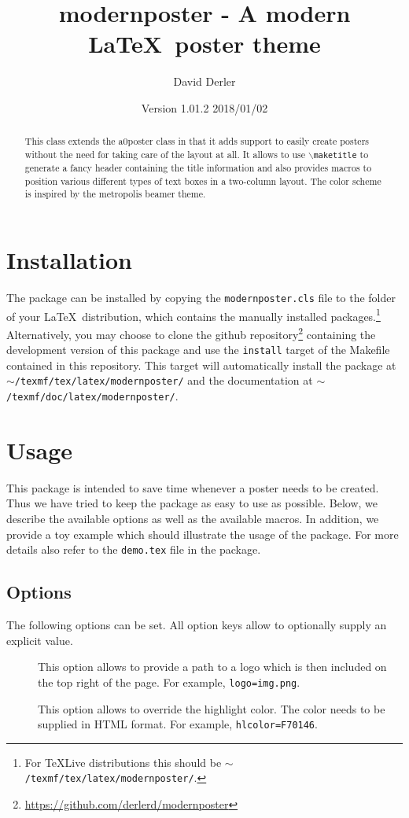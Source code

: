 \documentclass{article}
\title{modernposter - A modern \LaTeX~poster theme}
\author{David Derler}
\date{Version 1.01.2 2018/01/02}
\begin{document}
  \maketitle

  \begin{abstract}
\noindent This class extends the a0poster class in that it adds support to easily create posters without the need for taking care of the layout at all. It allows to use {\tt $\backslash$maketitle} to generate a fancy header containing the title information and also provides macros to position various different types of text boxes in a two-column layout. The color scheme  is inspired by the metropolis beamer theme.
  \end{abstract}
  \section{Installation}
  The package can be installed by copying the {\tt modernposter.cls} file to the folder of your \LaTeX~distribution, which contains the manually installed packages.\footnote{For TeXLive distributions this should be {\tt $\sim$/texmf/tex/latex/modernposter/}.} Alternatively, you may choose to clone the github repository\footnote{\url{https://github.com/derlerd/modernposter}} containing the development version of this package and use the {\tt install} target of the Makefile contained in this repository. This target will automatically install the package at {\tt $\sim$/texmf/tex/latex/modern\-poster/} and the documentation at {\tt $\sim$/texmf/doc/latex/modernposter/}.
  \section{Usage}
  This package is intended to save time whenever a poster needs to be created. Thus we have tried to keep the package as easy to use as possible. Below, we describe the available options as well as the available macros. In addition, we provide a toy example which should illustrate the usage of the package. For more details also refer to the {\tt demo.tex} file in the package.
  \subsection{Options}
  The following options can be set. All option keys allow to optionally supply an explicit value.  
  \begin{description}
  	\item[] This option allows to provide a path to a logo which is then included on the top right of the page. For example, {\tt logo=img.png}.
  	\item[] This option allows to override the highlight color. The color needs to be supplied in HTML format. For example, {\tt hlcolor=F70146}. 
  \end{description}
\end{document}
